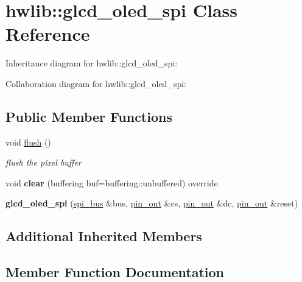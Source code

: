 \hypertarget{classhwlib_1_1glcd__oled__spi}{}\section{hwlib\+:\+:glcd\+\_\+oled\+\_\+spi Class Reference}
\label{classhwlib_1_1glcd__oled__spi}


Inheritance diagram for hwlib\+:\+:glcd\+\_\+oled\+\_\+spi\+:


Collaboration diagram for hwlib\+:\+:glcd\+\_\+oled\+\_\+spi\+:
\subsection*{Public Member Functions}
\begin{DoxyCompactItemize}
\item 
void \hyperlink{classhwlib_1_1glcd__oled__spi_a4bed9116dda2cc6752ac5447a834fa0f}{flush} ()
\begin{DoxyCompactList}\small\item\em flush the pixel buffer \end{DoxyCompactList}\item 
\mbox{\label{classhwlib_1_1glcd__oled__spi_ab66e790d8e3ebf4ed7e78f34dff1cfb8}} 
void {\bfseries clear} (buffering buf=buffering\+::unbuffered) override
\item 
\mbox{\label{classhwlib_1_1glcd__oled__spi_aa6ce9f602ab5b789ae3ad1d612d43f83}} 
{\bfseries glcd\+\_\+oled\+\_\+spi} (\hyperlink{classhwlib_1_1spi__bus}{spi\+\_\+bus} \&bus, \hyperlink{classhwlib_1_1pin__out}{pin\+\_\+out} \&cs, \hyperlink{classhwlib_1_1pin__out}{pin\+\_\+out} \&dc, \hyperlink{classhwlib_1_1pin__out}{pin\+\_\+out} \&reset)
\end{DoxyCompactItemize}
\subsection*{Additional Inherited Members}


\subsection{Member Function Documentation}
\mbox{\label{classhwlib_1_1glcd__oled__spi_a4bed9116dda2cc6752ac5447a834fa0f}} 
